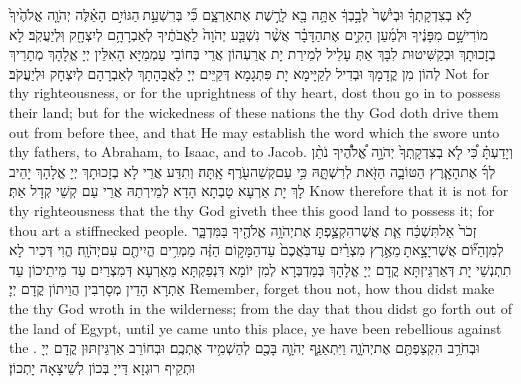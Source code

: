 {לֹ֣א בְצִדְקָתְךָ֗ וּבְיֹ֙שֶׁר֙ לְבָ֣בְךָ֔ אַתָּ֥ה בָ֖א לָרֶ֣שֶׁת אֶת\maqqaf אַרְצָ֑ם כִּ֞י בְּרִשְׁעַ֣ת \legarmeh  הַגּוֹיִ֣ם הָאֵ֗לֶּה יְהֹוָ֤ה אֱלֹהֶ֙יךָ֙ מוֹרִישָׁ֣ם מִפָּנֶ֔יךָ וּלְמַ֜עַן הָקִ֣ים אֶת\maqqaf הַדָּבָ֗ר אֲשֶׁ֨ר נִשְׁבַּ֤ע יְהֹוָה֙ לַאֲבֹתֶ֔יךָ לְאַבְרָהָ֥ם לְיִצְחָ֖ק וּֽלְיַעֲקֹֽב׃}
{לָא בְזָכוּתָךְ וּבְקַשִּׁיטוּת לִבָּךְ אַתְּ עָלֵיל לְמֵירַת יָת אֲרַעְהוֹן אֲרֵי בְּחוֹבֵי עַמְמַיָּא הָאִלֵּין יְיָ אֱלָהָךְ מְתָרֵיךְ לְהוֹן מִן קֳדָמָךְ וּבְדִיל לְקַיָּימָא יָת פִּתְגָמָא דְּקַיֵּים יְיָ לַאֲבָהָתָךְ לְאַבְרָהָם לְיִצְחָק וּלְיַעֲקֹב׃}
{Not for thy righteousness, or for the uprightness of thy heart, dost thou go in to possess their land; but for the wickedness of these nations the \lord\space thy God doth drive them out from before thee, and that He may establish the word which the \lord\space swore unto thy fathers, to Abraham, to Isaac, and to Jacob.}{}
{וְיָדַעְתָּ֗ כִּ֠י לֹ֤א בְצִדְקָֽתְךָ֙ יְהֹוָ֣ה אֱ֠לֹהֶ֠יךָ נֹתֵ֨ן לְךָ֜ אֶת\maqqaf הָאָ֧רֶץ הַטּוֹבָ֛ה הַזֹּ֖את לְרִשְׁתָּ֑הּ כִּ֥י עַם\maqqaf קְשֵׁה\maqqaf עֹ֖רֶף אָֽתָּה׃}
{וְתִדַּע אֲרֵי לָא בְזָכוּתָךְ יְיָ אֱלָהָךְ יָהֵיב לָךְ יָת אַרְעָא טָבְתָא הָדָא לְמֵירְתַהּ אֲרֵי עַם קְשֵׁי קְדָל אַתְּ׃}
{Know therefore that it is not for thy righteousness that the \lord\space thy God giveth thee this good land to possess it; for thou art a stiffnecked people.}{}
{זְכֹר֙ אַל\maqqaf תִּשְׁכַּ֔ח אֵ֧ת אֲשֶׁר\maqqaf הִקְצַ֛פְתָּ אֶת\maqqaf יְהֹוָ֥ה אֱלֹהֶ֖יךָ בַּמִּדְבָּ֑ר לְמִן\maqqaf הַיּ֞וֹם אֲשֶׁר\maqqaf יָצָ֣אתָ \legarmeh  מֵאֶ֣רֶץ מִצְרַ֗יִם עַד\maqqaf בֹּֽאֲכֶם֙ עַד\maqqaf הַמָּק֣וֹם הַזֶּ֔ה מַמְרִ֥ים הֱיִיתֶ֖ם עִם\maqqaf יְהֹוָֽה׃}
{הֱוִי דְּכִיר לָא תִתְנְשֵׁי יָת דְּאַרְגֵּיזְתָּא קֳדָם יְיָ אֱלָהָךְ בְּמַדְבְּרָא לְמִן יוֹמָא דִּנְפַקְתָּא מֵאַרְעָא דְּמִצְרַיִם עַד מֵיתֵיכוֹן עַד אַתְרָא הָדֵין מְסָרְבִין הֲוֵיתוֹן קֳדָם יְיָ׃}
{Remember, forget thou not, how thou didst make the \lord\space thy God wroth in the wilderness; from the day that thou didst go forth out of the land of Egypt, until ye came unto this place, ye have been rebellious against the \lord.}{}
{וּבְחֹרֵ֥ב הִקְצַפְתֶּ֖ם אֶת\maqqaf יְהֹוָ֑ה וַיִּתְאַנַּ֧ף יְהֹוָ֛ה בָּכֶ֖ם לְהַשְׁמִ֥יד אֶתְכֶֽם׃}
{וּבְחוֹרֵב אַרְגֵּיזְתּוּן קֳדָם יְיָ וּתְקֵיף רוּגְזָא דַּייָ בְּכוֹן לְשֵׁיצָאָה יָתְכוֹן׃}
